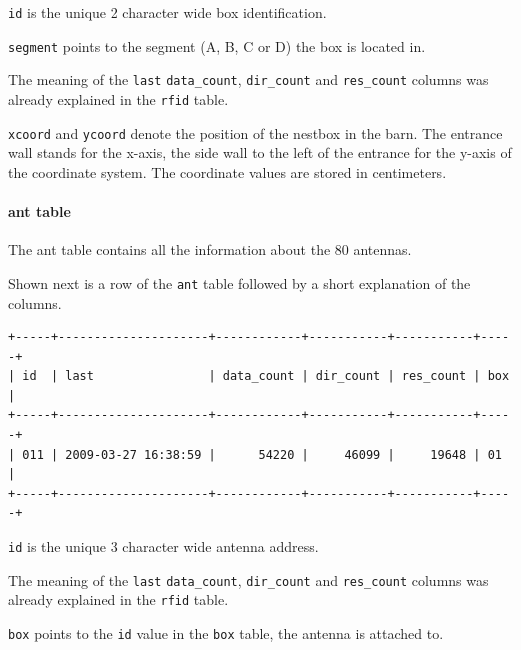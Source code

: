 \begin{mydesc}
	\item \lstinline|id| is the unique 2 character wide box identification.
	\item \lstinline|segment| points to the segment (A, B, C or D) the box is located in.
	\item The meaning of the \lstinline|last| \lstinline|data_count|, \lstinline|dir_count| and \lstinline|res_count| columns was already explained in the \lstinline|rfid| table.
	\item \lstinline|xcoord| and \lstinline|ycoord| denote the position of the nestbox in the barn. The entrance wall stands for the x-axis, the side wall to the left of the entrance for the y-axis of the coordinate system. The coordinate values are stored in centimeters. 
\end{mydesc}

\paragraph{ant table}
\label{para:ant_table}

The ant table contains all the information about the 80 antennas. 

Shown next is a row of the \lstinline|ant| table followed by a short explanation of the columns.
\codescript
{}
\begin{lstlisting}[frame=none]
+-----+---------------------+------------+-----------+-----------+-----+
| id  | last                | data_count | dir_count | res_count | box |
+-----+---------------------+------------+-----------+-----------+-----+
| 011 | 2009-03-27 16:38:59 |      54220 |     46099 |     19648 | 01  | 
+-----+---------------------+------------+-----------+-----------+-----+

\end{lstlisting}

\begin{mydesc}
	\item \lstinline|id| is the unique 3 character wide antenna address.
	\item The meaning of the \lstinline|last| \lstinline|data_count|, \lstinline|dir_count| and \lstinline|res_count| columns was already explained in the \lstinline|rfid| table.
	\item \lstinline|box| points to the \lstinline|id| value in the \lstinline|box| table, the antenna is attached to.
\end{mydesc}


